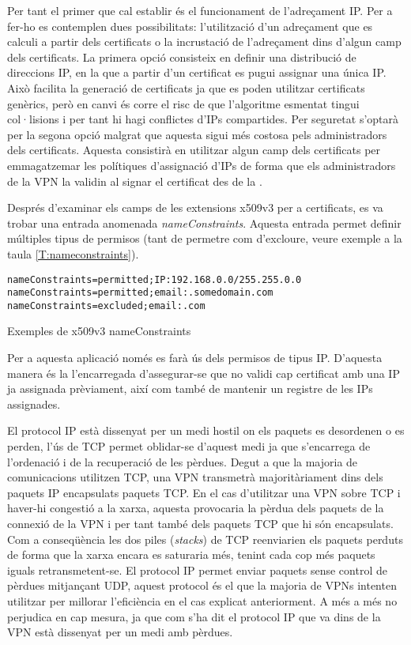 Per tant el primer que cal establir és el funcionament de l'adreçament IP. Per a fer-ho es contemplen dues possibilitats: l'utilització d'un adreçament que es calculi a partir dels certificats o la incrustació de l'adreçament dins d'algun camp dels certificats.
La primera opció consisteix en definir una distribució de direccions IP, en la que a partir d'un certificat es pugui assignar una única IP. Això facilita la generació de certificats ja que es poden utilitzar certificats genèrics, però en canvi és corre el risc de que l'algoritme esmentat tingui col·lisions i per tant hi hagi conflictes d'IPs compartides. Per seguretat s'optarà per la segona opció malgrat que aquesta sigui més costosa pels administradors dels certificats. Aquesta consistirà en utilitzar algun camp dels certificats per emmagatzemar les polítiques d'assignació d'IPs de forma que els administradors de la VPN la validin al signar el certificat des de la .

Després d'examinar els camps de les extensions x509v3 per a certificats, es va trobar una entrada anomenada \emph{nameConstraints}. Aquesta entrada permet definir múltiples tipus de permisos (tant de permetre com d'excloure, veure exemple a la taula \ref{T:nameconstraints}).
\begin{table}[htb]
\begin{center}
\begin{minipage}[htb]{0.6\linewidth}
\footnotesize
\begin{verbatim}
nameConstraints=permitted;IP:192.168.0.0/255.255.0.0
nameConstraints=permitted;email:.somedomain.com
nameConstraints=excluded;email:.com
\end{verbatim}
\end{minipage}
\caption{Exemples de x509v3 nameConstraints}
\label{T:nameconstraints}
\end{center}
\end{table}
Per a aquesta aplicació només es farà ús dels permisos de tipus IP. D'aquesta manera és la  l'encarregada d'assegurar-se que no validi cap certificat amb una IP ja assignada prèviament, així com també de mantenir un registre de les IPs assignades.

El protocol IP està dissenyat per un medi hostil on els paquets es desordenen o es perden, l'ús de TCP permet oblidar-se d'aquest medi ja que s'encarrega de l'ordenació i de la recuperació de les pèrdues. Degut a que la majoria de comunicacions utilitzen TCP, una VPN transmetrà majoritàriament dins dels paquets IP encapsulats paquets TCP.
En el cas d'utilitzar una VPN sobre TCP i haver-hi congestió a la xarxa, aquesta provocaria la pèrdua dels paquets de la connexió de la VPN i per tant també dels paquets TCP que hi són encapsulats. Com a conseqüència les dos piles (\emph{stacks}) de TCP reenviarien els paquets perduts de forma que la xarxa encara es saturaria més, tenint cada cop més paquets iguals retransmetent-se.
El protocol IP permet enviar paquets sense control de pèrdues mitjançant UDP, aquest protocol és el que la majoria de VPNs intenten utilitzar per millorar l'eficiència en el cas explicat anteriorment. A més a més no  perjudica en cap mesura, ja que com s'ha dit el protocol IP que va dins de la VPN està dissenyat per un medi amb pèrdues.

